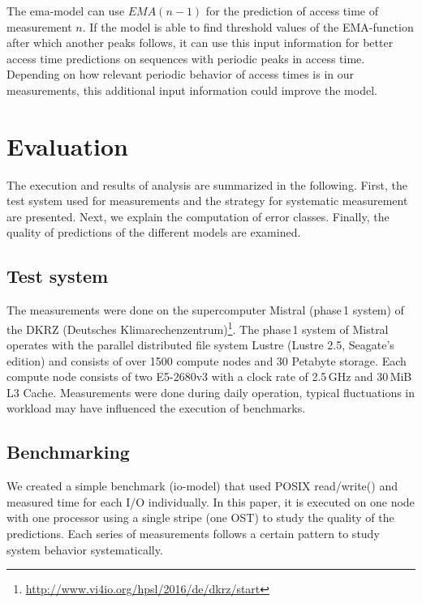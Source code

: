 \documentclass{superfri}
\begin{document}
	The ema-model can use $EMA(n-1)$ for the prediction of access time of measurement $n$.
	If the model is able to find threshold values of the EMA-function after which another peaks follows, it can use this input information for better access time predictions on sequences with periodic peaks in access time. Depending on how relevant periodic behavior of access times is in our measurements, this additional input information could improve the model.\medskip
	
	\section{Evaluation}
	\label{evaluation}
	The execution and results of analysis are summarized in the following.
	First, the test system used for measurements and the strategy for systematic measurement are presented.
	Next, we explain the computation of error classes.
	Finally, the quality of predictions of the different models are examined.
	
	\subsection{Test system}
	The measurements were done on the supercomputer Mistral (phase\,1 system) of the DKRZ (Deutsches Klimarechenzentrum)\footnote{\url{http://www.vi4io.org/hpsl/2016/de/dkrz/start}}.
	The phase\,1 system of Mistral operates with the parallel distributed file system Lustre (Lustre 2.5, Seagate's edition) and consists of over 1500 compute nodes and 30 Petabyte storage.
	Each compute node consists of two E5-2680v3 with a clock rate of 2.5\,GHz and 30\,MiB L3 Cache.
	Measurements were done during daily operation, typical fluctuations in workload may have influenced the execution of benchmarks.
	
	\subsection{Benchmarking}
	We created a simple benchmark (io-model) that used POSIX read/write() and measured time for each I/O individually.
	In this paper, it is executed on one node with one processor using a single stripe (one OST) to study the quality of the predictions.
	Each series of measurements follows a certain pattern to study system behavior systematically.
	
\end{document}
